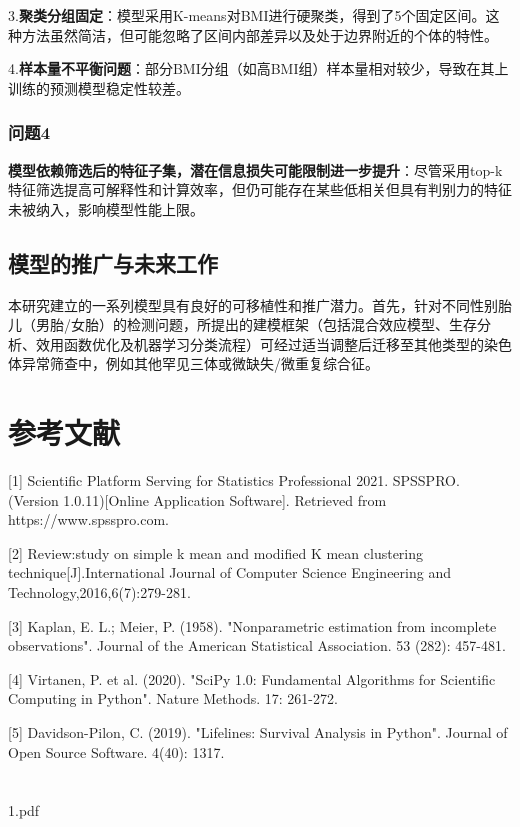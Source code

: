 \documentclass{article}
\begin{document}
3.\textbf{聚类分组固定}：模型采用K-means对BMI进行硬聚类，得到了5个固定区间。这种方法虽然简洁，但可能忽略了区间内部差异以及处于边界附近的个体的特性。

4.\textbf{样本量不平衡问题}：部分BMI分组（如高BMI组）样本量相对较少，导致在其上训练的预测模型稳定性较差。
\subsubsection{\textbf{问题4}}
\textbf{模型依赖筛选后的特征子集，潜在信息损失可能限制进一步提升}：尽管采用top-k特征筛选提高可解释性和计算效率，但仍可能存在某些低相关但具有判别力的特征未被纳入，影响模型性能上限。
\subsection{\textbf{模型的推广与未来工作}}
本研究建立的一系列模型具有良好的可移植性和推广潜力。首先，针对不同性别胎儿（男胎/女胎）的检测问题，所提出的建模框架（包括混合效应模型、生存分析、效用函数优化及机器学习分类流程）可经过适当调整后迁移至其他类型的染色体异常筛查中，例如其他罕见三体或微缺失/微重复综合征。

\section{\textbf{参考文献}}
 [1] Scientific Platform Serving for Statistics Professional 2021. SPSSPRO.
(Version 1.0.11)[Online Application Software]. Retrieved from https://www.spsspro.com.

[2] Review:study on simple k mean and modified K mean clustering
technique[J].International Journal of Computer Science Engineering and Technology,2016,6(7):279-281.

[3] Kaplan, E. L.; Meier, P. (1958). "Nonparametric estimation from incomplete
observations". Journal of the American Statistical Association. 53 (282): 457-481.

[4] Virtanen, P. et al. (2020). "SciPy 1.0: Fundamental Algorithms for Scientific
Computing in Python". Nature Methods. 17: 261-272.

[5] Davidson-Pilon, C. (2019). "Lifelines: Survival Analysis in Python". Journal
of Open Source Software. 4(40): 1317.
\section*{}

{1.pdf}
\end{document}
